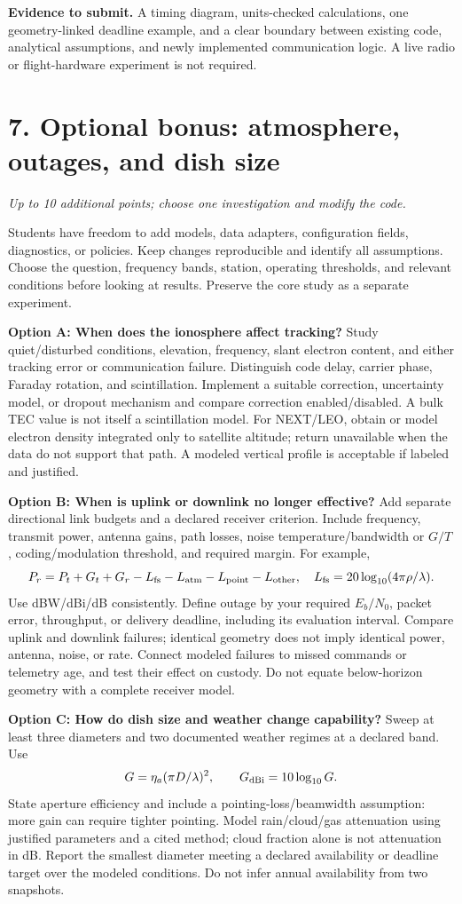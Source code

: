 \documentclass[11pt,letterpaper]{article}
\newcommand{\pageheading}[2]{\section*{\color{navy}#1}\textit{#2}\par}
\newcommand{\deliver}[1]{\medskip\textbf{Evidence to submit.} #1}
\begin{document}
\deliver{A timing diagram, units-checked calculations, one geometry-linked deadline example, and a clear boundary between existing code, analytical assumptions, and newly implemented communication logic. A live radio or flight-hardware experiment is not required.}

\newpage
\pageheading{7. Optional bonus: atmosphere, outages, and dish size}{Up to 10 additional points; choose one investigation and modify the code.}
Students have freedom to add models, data adapters, configuration fields, diagnostics, or policies. Keep changes reproducible and identify all assumptions. Choose the question, frequency bands, station, operating thresholds, and relevant conditions before looking at results. Preserve the core study as a separate experiment.

\textbf{Option A: When does the ionosphere affect tracking?} Study quiet/disturbed conditions, elevation, frequency, slant electron content, and either tracking error or communication failure. Distinguish code delay, carrier phase, Faraday rotation, and scintillation. Implement a suitable correction, uncertainty model, or dropout mechanism and compare correction enabled/disabled. A bulk TEC value is not itself a scintillation model. For NEXT/LEO, obtain or model electron density integrated only to satellite altitude; return unavailable when the data do not support that path. A modeled vertical profile is acceptable if labeled and justified.

\textbf{Option B: When is uplink or downlink no longer effective?} Add separate directional link budgets and a declared receiver criterion. Include frequency, transmit power, antenna gains, path losses, noise temperature/bandwidth or $G/T$, coding/modulation threshold, and required margin. For example,
\[
P_r=P_t+G_t+G_r-L_{\rm fs}-L_{\rm atm}-L_{\rm point}-L_{\rm other},
\quad L_{\rm fs}=20\log_{10}(4\pi\rho/\lambda).
\]
Use dBW/dBi/dB consistently. Define outage by your required $E_b/N_0$, packet error, throughput, or delivery deadline, including its evaluation interval. Compare uplink and downlink failures; identical geometry does not imply identical power, antenna, noise, or rate. Connect modeled failures to missed commands or telemetry age, and test their effect on custody. Do not equate below-horizon geometry with a complete receiver model.

\textbf{Option C: How do dish size and weather change capability?} Sweep at least three diameters and two documented weather regimes at a declared band. Use
\[
G=\eta_a(\pi D/\lambda)^2,\qquad G_{\rm dBi}=10\log_{10}G.
\]
State aperture efficiency and include a pointing-loss/beamwidth assumption: more gain can require tighter pointing. Model rain/cloud/gas attenuation using justified parameters and a cited method; cloud fraction alone is not attenuation in dB. Report the smallest diameter meeting a declared availability or deadline target over the modeled conditions. Do not infer annual availability from two snapshots.
\end{document}
